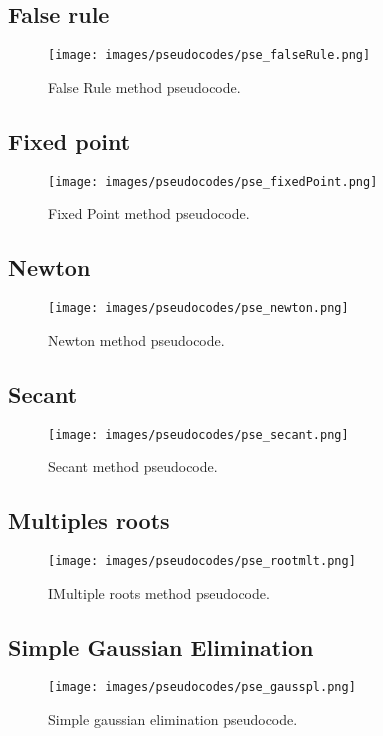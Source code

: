 \documentclass{article}
\begin{document}
\subsection{False rule}
\begin{figure}[ht]
\centering
\texttt{[image: images/pseudocodes/pse\_falseRule.png]}
\caption{\label{fig:py_bisc}False Rule method pseudocode.}
\end{figure}
\FloatBarrier

\subsection{Fixed point}
\begin{figure}[ht]
\centering
\texttt{[image: images/pseudocodes/pse\_fixedPoint.png]}
\caption{\label{fig:py_bisc}Fixed Point method pseudocode.}
\end{figure}
\FloatBarrier

\subsection{Newton}
\begin{figure}[ht]
\centering
\texttt{[image: images/pseudocodes/pse\_newton.png]}
\caption{\label{fig:py_bisc}Newton method pseudocode.}
\end{figure}
\FloatBarrier

\subsection{Secant}
\begin{figure}[ht]
\centering
\texttt{[image: images/pseudocodes/pse\_secant.png]}
\caption{\label{fig:py_bisc}Secant method pseudocode.}
\end{figure}
\FloatBarrier

\subsection{Multiples roots}
\begin{figure}[ht]
\centering
\texttt{[image: images/pseudocodes/pse\_rootmlt.png]}
\caption{\label{fig:py_bisc}IMultiple roots method pseudocode.}
\end{figure}
\FloatBarrier

\subsection{Simple Gaussian Elimination}
\begin{figure}[ht]
\centering
\texttt{[image: images/pseudocodes/pse\_gausspl.png]}
\caption{\label{fig:py_bisc}Simple gaussian elimination pseudocode.}
\end{figure}
\FloatBarrier
\end{document}
